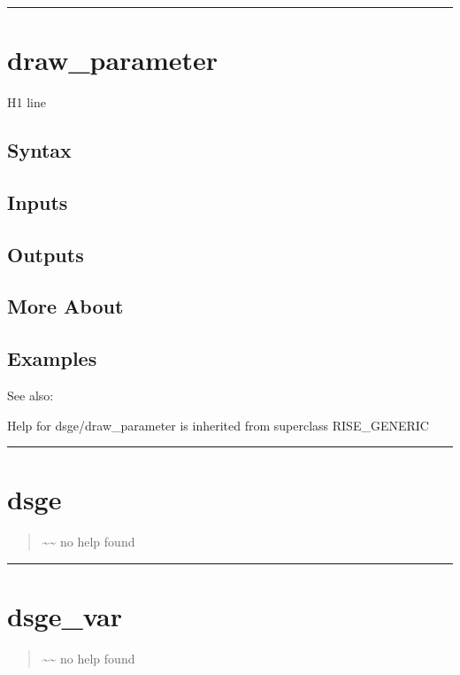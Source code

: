 \documentclass[letterpaper,10pt,english]{sphinxmanual}
\begin{document}
\bigskip\hrule{}\bigskip



\section{draw\_parameter}
\label{classes/models/@dsge/dsge:id27}\label{classes/models/@dsge/dsge:draw-parameter}
H1 line


\subsection{Syntax}
\label{classes/models/@dsge/dsge:id28}

\subsection{Inputs}
\label{classes/models/@dsge/dsge:id29}

\subsection{Outputs}
\label{classes/models/@dsge/dsge:id30}

\subsection{More About}
\label{classes/models/@dsge/dsge:id31}

\subsection{Examples}
\label{classes/models/@dsge/dsge:id32}
See also:

Help for dsge/draw\_parameter is inherited from superclass RISE\_GENERIC


\bigskip\hrule{}\bigskip



\section{dsge}
\label{classes/models/@dsge/dsge:id33}\label{classes/models/@dsge/dsge:dsge}\begin{quote}

\textasciitilde{}\textasciitilde{} no help found
\end{quote}


\bigskip\hrule{}\bigskip



\section{dsge\_var}
\label{classes/models/@dsge/dsge:id34}\label{classes/models/@dsge/dsge:dsge-var}\begin{quote}

\textasciitilde{}\textasciitilde{} no help found
\end{quote}
\end{document}
